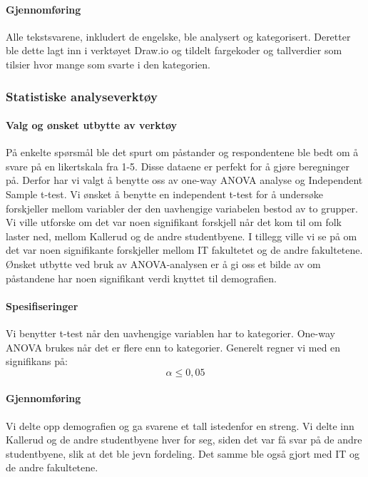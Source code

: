 \paragraph{Gjennomføring}
Alle tekstsvarene, inkludert de engelske, ble analysert og kategorisert. Deretter ble dette lagt inn i verktøyet Draw.io og tildelt fargekoder og tallverdier som tilsier hvor mange som svarte i den kategorien. 


\subsubsection{Statistiske analyseverktøy}

\paragraph{Valg og ønsket utbytte av verktøy}
På enkelte spørsmål ble det spurt om påstander og respondentene ble bedt om å svare på en likertskala fra 1-5. Disse dataene er perfekt for å gjøre beregninger på. Derfor har vi valgt å benytte oss av one-way ANOVA analyse og Independent Sample t-test. Vi ønsket å benytte en independent t-test for å undersøke forskjeller mellom variabler der den uavhengige variabelen bestod av to grupper. Vi ville utforske om det var noen signifikant forskjell når det kom til om folk laster ned, mellom Kallerud og de andre studentbyene. I tillegg ville vi se på om det var noen signifikante forskjeller mellom IT fakultetet og de andre fakultetene. Ønsket utbytte ved bruk av ANOVA-analysen er å gi oss et bilde av om påstandene har noen signifikant verdi knyttet til demografien.

\paragraph{Spesifiseringer}
Vi benytter t-test når den uavhengige variablen har to kategorier. One-way ANOVA brukes når det er flere enn to kategorier. Generelt regner vi med en signifikans på: \[\alpha \le 0,05\]

\paragraph{Gjennomføring}
Vi delte opp demografien og ga svarene et tall istedenfor en streng. Vi delte inn Kallerud og de andre studentbyene hver for seg, siden det var få svar på de andre studentbyene, slik at det ble jevn fordeling. Det samme ble også gjort med IT og de andre fakultetene. 

